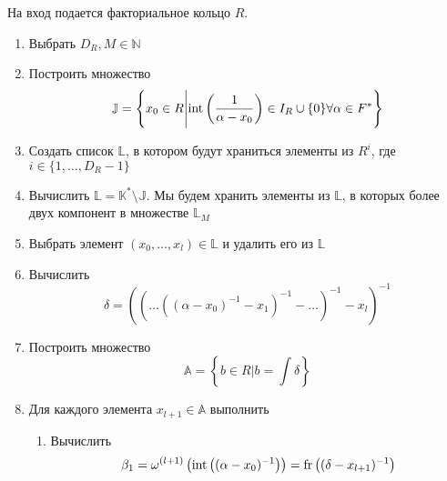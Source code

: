 \documentclass[_00_dissertation.tex]{subfiles}
\begin{document}
\begin{algorithm}\label{algorithm:R_in_T}
    На вход подается факториальное кольцо $R$.
    
    \begin{enumerate}
        \item Выбрать $D_R, M \in \mathbb{N}$
        
        \item Построить множество
        \begin{equation*}
            \mathbb{J} = \left\{
                x_0 \in R \Bigg| \textrm{int}\left(\frac{1}{\alpha-x_0}\right) \in I_{R} \cup \{0\} \forall \alpha \in F^{*}
            \right\}
        \end{equation*}
        
        \item Создать список $\mathbb{L}$, в котором будут храниться элементы из $R^i$, где $i \in \{1, \ldots, D_R - 1\}$

        \item Вычислить $\mathbb{L}=\mathbb{K}^*\setminus\mathbb{J}$. Мы будем хранить элементы из $\mathbb{L}$, в которых более двух компонент в множестве $\mathbb{L}_M$

        \item\label{step:every_element_in_L} Выбрать элемент $(x_0, \ldots, x_l) \in \mathbb{L}$ и удалить его из $\mathbb{L}$

        \item Вычислить
        \begin{equation*}
            \delta = \left(
                \left(
                    \ldots\left(
                        \left(
                            \alpha - x_0
                        \right)^{-1} - x_1
                    \right)^{-1} - \ldots
                \right)^{-1} - x_l
            \right)^{-1}
        \end{equation*}

        \item Построить множество
        \begin{equation*}
            \mathbb{A} = \left\{
                b \in R \big| b = \int{\delta}
            \right\}
        \end{equation*}

        \item\label{step:every_element_in_A} Для каждого элемента $x_{l+1} \in \mathbb{A}$ выполнить
        \begin{enumerate}
            \item Вычислить
            \begin{equation*}
                \beta_1 = \omega^{(l+1)} \left(
                    \textrm{int}\left((\alpha-x_0)^{-1}\right)
                \right) = \textrm{fr}\left((\delta-x_{l+1})^{-1}\right)
            \end{equation*}


\end{enumerate}
\end{enumerate}
\end{algorithm}
\end{document}
